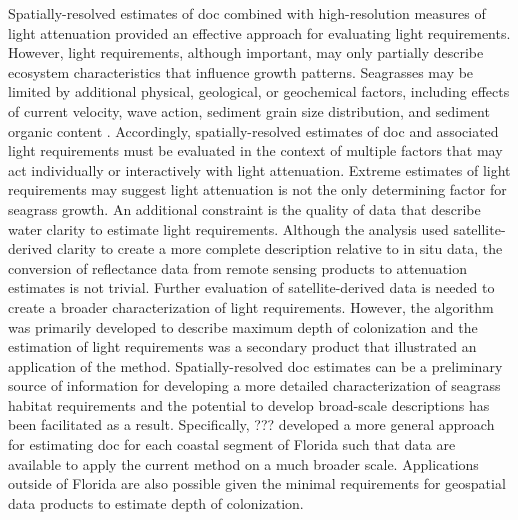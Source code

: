 \documentclass[letterpaper,12pt,oneside]{article}\usepackage[]{graphicx}\usepackage[]{color}
\begin{document}
Spatially-resolved estimates of \ac{doc} combined with high-resolution measures of light attenuation provided an effective approach for evaluating light requirements. However, light requirements, although important, may only partially describe ecosystem characteristics that influence growth patterns.  Seagrasses may be limited by additional physical, geological, or geochemical factors, including effects of current velocity, wave action, sediment grain size distribution, and sediment organic content \citep{Koch01}.  Accordingly, spatially-resolved estimates of \ac{doc} and associated light requirements must be evaluated in the context of multiple factors that may act individually or interactively with light attenuation.  Extreme estimates of light requirements may suggest light attenuation is not the only determining factor for seagrass growth.  An additional constraint is the quality of data that describe water clarity to estimate light requirements.  Although the analysis used satellite-derived clarity to create a more complete description relative to in situ data, the conversion of reflectance data from remote sensing products to attenuation estimates is not trivial.  Further evaluation of satellite-derived data is needed to create a broader characterization of light requirements.  However, the algorithm was primarily developed to describe maximum depth of colonization and the estimation of light requirements was a secondary product that illustrated an application of the method.  Spatially-resolved \ac{doc} estimates can be a preliminary source of information for developing a more detailed characterization of seagrass habitat requirements and the potential to develop broad-scale descriptions has been facilitated as a result.  Specifically, ??? developed a more general approach for estimating \ac{doc} for each coastal segment of Florida such that data are available to apply the current method on a much broader scale.  Applications outside of Florida are also possible given the minimal requirements for geospatial data products to estimate depth of colonization.  

\clearpage
\begin{singlespace}


\end{singlespace}
\clearpage

\end{document}
